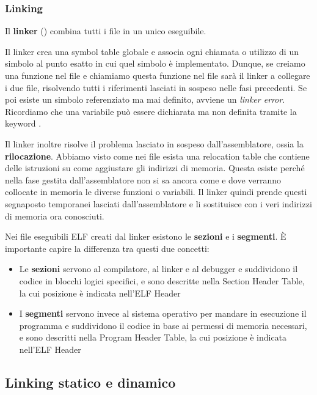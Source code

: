 \documentclass[11pt, a4paper, titlepage, oneside]{scrbook}
\begin{document}
\subsubsection*{Linking}

\begin{Definizione}[Linker]
\label{def-linker}
Il \textbf{linker} () combina tutti i file  in un unico eseguibile. 
\end{Definizione}
Il linker crea una symbol table globale e associa ogni chiamata o utilizzo di un simbolo al punto esatto in cui quel simbolo è implementato. Dunque, se creiamo una funzione  nel file  e chiamiamo questa funzione nel file  sarà il linker a collegare i due file, risolvendo tutti i riferimenti lasciati in sospeso nelle fasi precedenti. Se poi esiste un simbolo referenziato ma mai definito, avviene un \textit{linker error}. Ricordiamo che una variabile può essere dichiarata ma non definita tramite la keyword .

Il linker inoltre risolve il problema lasciato in sospeso dall'assemblatore, ossia la \textbf{rilocazione}. Abbiamo visto come nei file  esista una relocation table che contiene delle istruzioni su come aggiustare gli indirizzi di memoria. Questa esiste perché nella fase gestita dall'assemblatore non si sa ancora come e dove verranno collocate in memoria le diverse funzioni o variabili. Il linker quindi prende questi segnaposto temporanei lasciati dall'assemblatore e li sostituisce con i veri indirizzi di memoria ora conosciuti.

Nei file eseguibili ELF creati dal linker esistono le \textbf{sezioni} e i \textbf{segmenti}. È importante capire la differenza tra questi due concetti:
\begin{itemize}
    \item Le \textbf{sezioni} servono al compilatore, al linker e al debugger e suddividono il codice in blocchi logici specifici, e sono descritte nella Section Header Table, la cui posizione è indicata nell'ELF Header
    \item  I \textbf{segmenti} servono invece al sistema operativo per mandare in esecuzione il programma e suddividono il codice in base ai permessi di memoria necessari, e sono descritti nella Program Header Table, la cui posizione è indicata nell'ELF Header
\end{itemize}

\subsection{Linking statico e dinamico}
\end{document}

